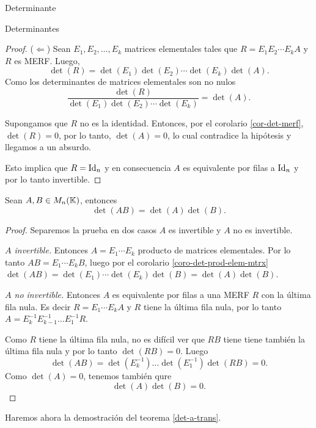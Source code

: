 \begin{chapter}{Determinante}
\begin{section}{Determinantes}
\begin{proof}
        ($\Leftarrow$) Sean $E_1, E_2, \ldots, E_k$ matrices elementales tales que $R = E_1 E_2 \cdots E_k A$ y $R$ es MERF. Luego,
        \begin{equation*}
            \det(R) = \det(E_1) \det(E_2) \cdots \det(E_k) \det(A).
        \end{equation*}
        Como los determinantes de matrices  elementales son no nulos
        \begin{equation*}
            \frac{\det(R)}{\det(E_1) \det(E_2) \cdots \det(E_k) } = \det(A). \tag{*}
        \end{equation*}


        Supongamos que $R$ no es la identidad.  Entonces, por el corolario \ref{cor-det-merf}, $\det(R) =0$,  por lo tanto, $\det(A)=0$, lo cual contradice la hipótesis y llegamos a un absurdo.

        Esto implica que  $R= \operatorname{Id}_n$ y en consecuencia  $A$ es equivalente por filas a $\operatorname{Id}_n$ y por lo tanto  invertible.
    \end{proof}

    \begin{teorema}\label{th-dem-detAB}  Sean $A,B \in M_n(\mathbb K)$,  entonces
        $$\det (A B) = \det(A)\det(B).$$
    \end{teorema}
    \begin{proof} Separemos la prueba en dos casos  $A$ es invertible  y  $A$ no es invertible.

        \textit{$A$ invertible.} Entonces $A= E_1\cdots E_k$ producto de matrices elementales. Por lo tanto  $AB =  E_1\cdots E_kB$, luego por el corolario \ref{coro-det-prod-elem-mtrx}  $\det(AB) =  \det(E_1)\cdots \det(E_k)\det(B) = \det(A)\det(B)$.

        \textit{$A$ no invertible.}  Entonces $A$  es equivalente por filas a una MERF $R$ con la última fila nula. Es decir $R =E_1\cdots E_kA$ y $R$ tiene la última fila nula, por  lo tanto $A=  E_k^{-1}E_{k-1}^{-1}\ldots E_1^{-1}R$.

        Como $R$ tiene la última fila nula, no es difícil ver que  $RB$ tiene tiene también la última fila nula y por lo tanto $\det(RB)=0$. Luego
        $$
            \det(AB) = \det( E_k^{-1}) \ldots \det(E_1^{-1})\det(RB) =0.
        $$
        Como  $\det(A)=0$, tenemos también qure
        $$
            \det(A)\det(B) =0.
        $$
    \end{proof}

    Haremos ahora la demostración del teorema \ref{det-a-trans}.


\end{section}
\end{chapter}
